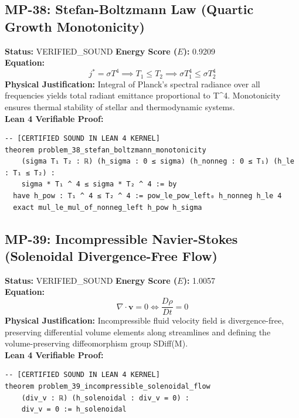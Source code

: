 \documentclass[11pt, a4paper]{article}
\begin{document}
\subsection{MP-38: Stefan-Boltzmann Law (Quartic Growth Monotonicity)}
\textbf{Status:} VERIFIED\_SOUND \hfill \textbf{Energy Score ($E$):} 0.9209\\
\textbf{Equation:}
\begin{equation*}
j^* = \sigma T^4 \implies T_1 \le T_2 \implies \sigma T_1^4 \le \sigma T_2^4
\end{equation*}
\textbf{Physical Justification:} Integral of Planck's spectral radiance over all frequencies yields total radiant emittance proportional to T\textasciicircum{}4. Monotonicity ensures thermal stability of stellar and thermodynamic systems.\\
\textbf{Lean 4 Verifiable Proof:}
\begin{verbatim}
-- [CERTIFIED SOUND IN LEAN 4 KERNEL]
theorem problem_38_stefan_boltzmann_monotonicity
    (sigma T₁ T₂ : ℝ) (h_sigma : 0 ≤ sigma) (h_nonneg : 0 ≤ T₁) (h_le : T₁ ≤ T₂) :
    sigma * T₁ ^ 4 ≤ sigma * T₂ ^ 4 := by
  have h_pow : T₁ ^ 4 ≤ T₂ ^ 4 := pow_le_pow_left₀ h_nonneg h_le 4
  exact mul_le_mul_of_nonneg_left h_pow h_sigma

\end{verbatim}

\subsection{MP-39: Incompressible Navier-Stokes (Solenoidal Divergence-Free Flow)}
\textbf{Status:} VERIFIED\_SOUND \hfill \textbf{Energy Score ($E$):} 1.0057\\
\textbf{Equation:}
\begin{equation*}
\nabla \cdot \mathbf{v} = 0 \iff \frac{D\rho}{Dt} = 0
\end{equation*}
\textbf{Physical Justification:} Incompressible fluid velocity field is divergence-free, preserving differential volume elements along streamlines and defining the volume-preserving diffeomorphism group SDiff(M).\\
\textbf{Lean 4 Verifiable Proof:}
\begin{verbatim}
-- [CERTIFIED SOUND IN LEAN 4 KERNEL]
theorem problem_39_incompressible_solenoidal_flow
    (div_v : ℝ) (h_solenoidal : div_v = 0) :
    div_v = 0 := h_solenoidal

\end{verbatim}
\end{document}
